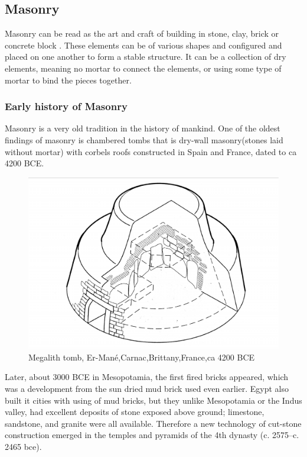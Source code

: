\subsection{Masonry}

Masonry can be read as the art and craft of building in stone, clay, brick or concrete block \cite{ref:brickBrit}. These elements can be of various shapes and configured and placed on one another to form a stable structure. It can be a collection of dry elements, meaning no mortar to connect the elements, or using some type of mortar to bind the pieces together. 



\subsubsection{Early history of Masonry}
Masonry is a very old tradition in the history of mankind. One of the oldest findings of masonry is  chambered tombs that is  dry-wall masonry(stones laid without mortar) with corbels roofs constructed in Spain and France, dated to ca 4200 BCE\cite{ref:buildConstrBrit}. 

\begin{figure}[H]
\centering
\includegraphics[height=0.4\linewidth ]{figure/Introduction/oldMasonry2.pdf}
\caption{Megalith tomb, Er-Mané,Carnac,Brittany,France,ca 4200 BCE\cite{ref:WorldHistory}}
\end{figure}

Later, about 3000 BCE in Mesopotamia, the first fired bricks appeared, which was a development from the sun dried mud brick used even earlier.
Egypt also built it cities with using of mud bricks, but they unlike Mesopotamia or the Indus valley, had excellent deposits of stone exposed above ground; limestone, sandstone, and granite were all available.
Therefore a new technology of cut-stone construction emerged in the temples and pyramids of the 4th dynasty (c. 2575–c. 2465 bce)\cite{ref:buildConstrBrit}. 

